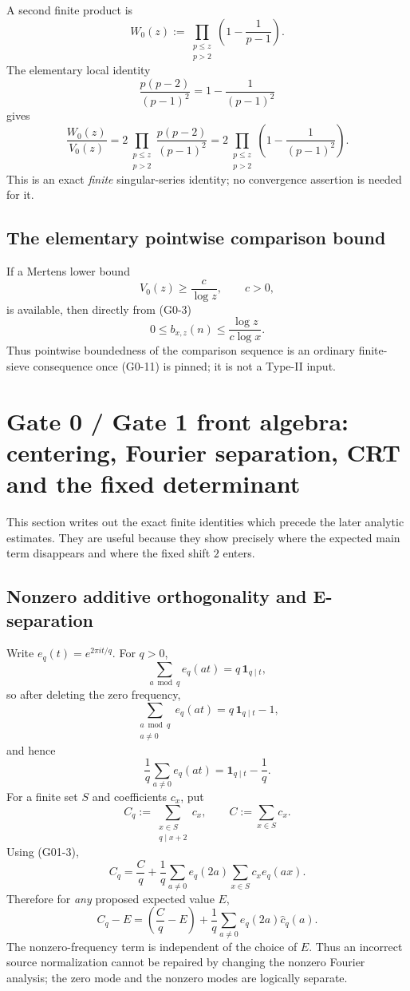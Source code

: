 \documentclass[11pt]{article}
\theoremstyle{definition}
\theoremstyle{remark}
\newcommand{\1}{\mathbf 1}
\begin{document}
A second finite product is
\[
 W_0(z):=\prod_{\substack{p\le z\\p>2}}
 \left(1-\frac1{p-1}\right).
\tag{G0-8}
\]
The elementary local identity
\[
 \frac{p(p-2)}{(p-1)^2}=1-\frac1{(p-1)^2}
\tag{G0-9}
\]
gives
\[
 \boxed{
 \frac{W_0(z)}{V_0(z)}
 =2\prod_{\substack{p\le z\\p>2}}
 \frac{p(p-2)}{(p-1)^2}
 =2\prod_{\substack{p\le z\\p>2}}
 \left(1-\frac1{(p-1)^2}\right).}
\tag{G0-10}
\]
This is an exact \emph{finite} singular-series identity; no convergence assertion is needed for it.

\subsection{The elementary pointwise comparison bound}

If a Mertens lower bound
\[
 V_0(z)\ge\frac{c}{\log z},\qquad c>0,
\tag{G0-11}
\]
is available, then directly from (G0-3)
\[
 0\le b_{x,z}(n)\le\frac{\log z}{c\log x}.
\tag{G0-12}
\]
Thus pointwise boundedness of the comparison sequence is an ordinary finite-sieve consequence once (G0-11) is
pinned; it is not a Type-II input.

\section{Gate 0 / Gate 1 front algebra: centering, Fourier separation, CRT and the fixed determinant}
\label{sec:g01-front}

This section writes out the exact finite identities which precede the later analytic estimates.  They are useful
because they show precisely where the expected main term disappears and where the fixed shift $2$ enters.

\subsection{Nonzero additive orthogonality and E-separation}

Write $e_q(t)=e^{2\pi i t/q}$.  For $q>0$,
\[
 \sum_{a\bmod q}e_q(at)=q\,\1_{q\mid t},
\tag{G01-1}
\]
so after deleting the zero frequency,
\[
 \boxed{
 \sum_{\substack{a\bmod q\\a\ne0}}e_q(at)
 =q\,\1_{q\mid t}-1,}
\tag{G01-2}
\]
and hence
\[
 \frac1q\sum_{a\ne0}e_q(at)=\1_{q\mid t}-\frac1q.
\tag{G01-3}
\]
For a finite set $S$ and coefficients $c_x$, put
\[
 C_q:=\sum_{\substack{x\in S\\q\mid x+2}}c_x,
 \qquad C:=\sum_{x\in S}c_x.
\]
Using (G01-3),
\[
 \boxed{
 C_q=\frac Cq+
 \frac1q\sum_{a\ne0}e_q(2a)\sum_{x\in S}c_xe_q(ax).}
\tag{G01-4}
\]
Therefore for \emph{any} proposed expected value $E$,
\[
 C_q-E=\left(\frac Cq-E\right)
 +\frac1q\sum_{a\ne0}e_q(2a)\widehat c_q(a).
\tag{G01-5}
\]
The nonzero-frequency term is independent of the choice of $E$.  Thus an incorrect source normalization cannot
be repaired by changing the nonzero Fourier analysis; the zero mode and the nonzero modes are logically separate.
\end{document}
